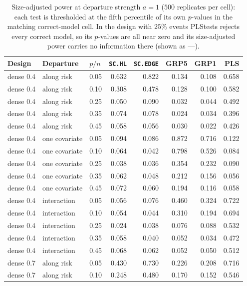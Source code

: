 \begin{table}[htbp]
\centering
\caption{Size-adjusted power at departure strength $a = 1$ ($500$ replicates per cell): each test is thresholded at the fifth percentile of its own $p$-values in the matching correct-model cell. In the design with $25\%$ events PLStests rejects every correct model, so its $p$-values are all near zero and its size-adjusted power carries no information there (shown as ---).}
\label{tab:t40power}
\small
\setlength{\tabcolsep}{4pt}
\begin{tabular}{lllrrrrr}
\toprule
Design & Departure & $p/n$ & \texttt{SC.HL} & \texttt{SC.EDGE} & GRP5 & GRP1 & PLS \\
\midrule
dense 0.4 & along risk & 0.05 & 0.632 & 0.822 & 0.134 & 0.108 & 0.658 \\
dense 0.4 & along risk & 0.10 & 0.308 & 0.478 & 0.128 & 0.100 & 0.582 \\
dense 0.4 & along risk & 0.25 & 0.050 & 0.090 & 0.032 & 0.044 & 0.492 \\
dense 0.4 & along risk & 0.35 & 0.074 & 0.078 & 0.024 & 0.034 & 0.396 \\
dense 0.4 & along risk & 0.45 & 0.058 & 0.056 & 0.030 & 0.022 & 0.426 \\
\addlinespace
dense 0.4 & one covariate & 0.05 & 0.094 & 0.086 & 0.872 & 0.716 & 0.122 \\
dense 0.4 & one covariate & 0.10 & 0.064 & 0.042 & 0.798 & 0.526 & 0.084 \\
dense 0.4 & one covariate & 0.25 & 0.038 & 0.036 & 0.354 & 0.232 & 0.090 \\
dense 0.4 & one covariate & 0.35 & 0.062 & 0.048 & 0.212 & 0.156 & 0.056 \\
dense 0.4 & one covariate & 0.45 & 0.072 & 0.060 & 0.194 & 0.116 & 0.058 \\
\addlinespace
dense 0.4 & interaction & 0.05 & 0.056 & 0.076 & 0.460 & 0.324 & 0.722 \\
dense 0.4 & interaction & 0.10 & 0.054 & 0.044 & 0.310 & 0.194 & 0.694 \\
dense 0.4 & interaction & 0.25 & 0.024 & 0.038 & 0.076 & 0.088 & 0.532 \\
dense 0.4 & interaction & 0.35 & 0.058 & 0.040 & 0.052 & 0.034 & 0.472 \\
dense 0.4 & interaction & 0.45 & 0.068 & 0.062 & 0.052 & 0.050 & 0.512 \\
\addlinespace
dense 0.7 & along risk & 0.05 & 0.430 & 0.730 & 0.226 & 0.208 & 0.716 \\
dense 0.7 & along risk & 0.10 & 0.248 & 0.480 & 0.170 & 0.152 & 0.546 \\

\end{tabular}
\end{table}
